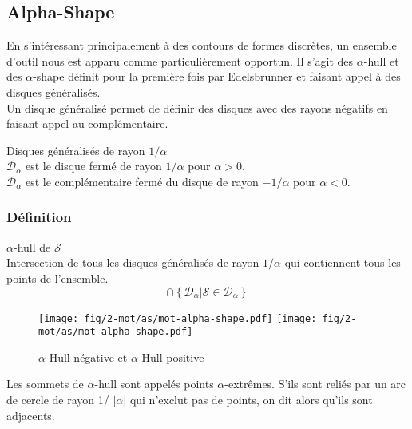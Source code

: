 \subsection{Alpha-Shape}

En s'intéressant principalement à des contours de formes discrètes, un ensemble d'outil nous est apparu comme particulièrement opportun. Il s'agit des $\alpha$-hull et des $\alpha$-shape définit pour la première fois par Edelsbrunner \cite{EdeKirSei83} et faisant appel à des disques généralisés.\\

Un disque généralisé permet de définir des disques avec des rayons négatifs en faisant appel au complémentaire.

\begin{Definition}{Disques généralisés de rayon $1/\alpha$}\\
\label{def:dis-gen}
   $\mathcal{D}_{\alpha}$ est le disque fermé de rayon $1/\alpha$ pour $\alpha > 0$.\\
   $\mathcal{D}_{\alpha}$ est le complémentaire fermé du disque de rayon $- 1/\alpha$ pour $\alpha < 0$.
\end{Definition}

\subsubsection{Définition}

\begin{Definition}{$\alpha$-hull de $\mathcal{S}$}\\
\label{def:ah-txt}
    Intersection de tous les disques généralisés de rayon $1/\alpha$ qui contiennent tous les points de l'ensemble.
    $$\cap \left\{ \mathcal{D}_{\alpha} | \mathcal{S} \in \mathcal{D}_{\alpha} \right\}$$
\end{Definition}

\begin{figure}[H]
  \centering
  \texttt{[image: fig/2-mot/as/mot-alpha-shape.pdf]}
  \texttt{[image: fig/2-mot/as/mot-alpha-shape.pdf]}
  \caption{$\alpha$-Hull négative et $\alpha$-Hull positive }
\end{figure}
  

Les sommets de $\alpha$-hull sont appelés points $\alpha$-extrêmes. S'ils sont reliés par un arc de cercle de rayon 1/ $\lvert \alpha \rvert$ qui n'exclut pas de points, on dit alors qu'ils sont adjacents.

